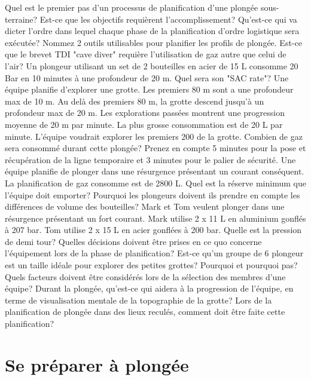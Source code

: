 \documentclass[english,10pt,a4paper]{article}
\begin{document}
	\begin{outline}
		\1 Quel est le premier pas d’un processus de planification d’une plongée sous-terraine?
		\1 Est-ce que les objectifs requièrent l’accomplissement?
		\1 Qu’est-ce qui va dicter l’ordre dans lequel chaque phase de la planification d’ordre logistique sera exécutée?
		\1 Nommez 2 outils utilisables pour planifier les profils de plongée.
		\1 Est-ce que le brevet TDI "cave diver" requière l’utilisation de gaz autre que celui de l’air?
		\1 Un plongeur utilisant un set de 2 bouteilles en acier de 15 L consomme 20 Bar en 10 minutes à une profondeur de 20 m. Quel sera son "SAC rate"?
		\1 Une équipe planifie d’explorer une grotte. Les premiers 80 m sont a une profondeur max de 10 m. Au delà des premiers 80 m, la grotte descend jusqu'à un profondeur max de 20 m.  Les explorations passées montrent une progression moyenne de 20 m par minute. La plus grosse consommation est de 20 L par minute. L’équipe voudrait explorer les premiers 200 de la grotte. Combien de gaz sera consommé durant cette plongée? Prenez en compte 5 minutes pour la pose et récupération de la ligne temporaire et 3 minutes pour le palier de sécurité.
		\1 Une équipe planifie de plonger dans une résurgence présentant un courant conséquent. La planification de gaz consomme est de 2800 L. Quel est la réserve minimum que l’équipe doit emporter?
		\1 Pourquoi les plongeurs doivent ils prendre en compte les différences de volume des bouteilles?
		\1 Mark et Tom veulent plonger dans une résurgence présentant un fort courant. Mark utilise 2 x 11 L en aluminium gonflés à 207 bar. Tom utilise 2 x 15 L en acier gonflées à 200 bar. Quelle est la pression de demi tour?
		\1 Quelles décisions doivent être prises en ce quo concerne l’équipement lors de la phase de planification?
		\1 Est-ce qu’un groupe de 6 plongeur est un taille idéale pour explorer des petites grottes? Pourquoi et pourquoi pas?
		\1 Quels facteurs doivent être considérés lors de la sélection des membres d’une équipe?
		\1 Durant la plongée, qu’est-ce qui aidera à la progression de l’équipe, en terme de visualisation mentale de la topographie de la grotte?
		\1 Lors de la planification de plongée dans des lieux reculés, comment doit être faite cette planification?
	\end{outline}
	\sectionpage

	\section{Se préparer à plongée}
\end{document}
